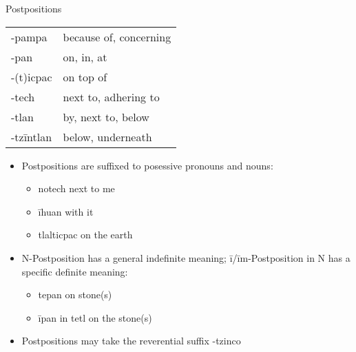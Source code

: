 \documentclass[12pt]{beamer}
\newcommand{\nah}[1]{\textcolor{nahgrn}{#1}}
\newcommand{\trs}[1]{\textcolor{nahblu}{#1}}
\begin{document}
\begin{frame}
\begin{columns}[t]
\begin{column}{.23\linewidth}
\begin{block}{Postpositions}
\begin{tabular}{ll}
					\nah{-pampa}    & \trs{because of, concerning}         \\
					\nah{-pan}      & \trs{on, in, at}                     \\
					\nah{-(t)icpac} & \trs{on top of}                      \\
					\nah{-tech}     & \trs{next to, adhering to}           \\
					\nah{-tlan}     & \trs{by, next to, below}             \\
					\nah{-tzīntlan} & \trs{below, underneath}              \\
				\end{tabular}%
				\begin{itemize}
					\item Postpositions are suffixed to posessive pronouns and nouns:
					\begin{itemize}
						\item \nah{notech} \trs{next to me}
						\item \nah{īhuan} \trs{with it}
						\item \nah{tlalticpac} \trs{on the earth}
					\end{itemize}
					\item N-Postposition has a general indefinite meaning; \nah{ī/īm}-Postposition \nah{in} N has a specific definite meaning:
					\begin{itemize}
						\item \nah{tepan} \trs{on stone(s)}
						\item \nah{īpan in tetl} \trs{on the stone(s)}
					\end{itemize}
					\item Postpositions may take the reverential suffix \nah{-tzinco}
				\end{itemize}
			\end{block}
		\end{column}
	\end{columns}
\end{frame}
\end{document}
